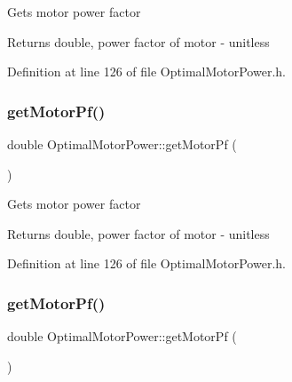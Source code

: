 Gets motor power factor

\begin{DoxyReturn}{Returns}
double, power factor of motor -\/ unitless 
\end{DoxyReturn}


Definition at line 126 of file Optimal\+Motor\+Power.\+h.

\mbox{\label{class_optimal_motor_power_a94d4c8a84c1bd19b799e35b966368f5a}} 
\subsubsection{\texorpdfstring{get\+Motor\+Pf()}{getMotorPf()}\hspace{0.1cm}{\footnotesize\ttfamily [2/3]}}
{\footnotesize\ttfamily double Optimal\+Motor\+Power\+::get\+Motor\+Pf (\begin{DoxyParamCaption}{ }\end{DoxyParamCaption})\hspace{0.3cm}{\ttfamily [inline]}}

Gets motor power factor

\begin{DoxyReturn}{Returns}
double, power factor of motor -\/ unitless 
\end{DoxyReturn}


Definition at line 126 of file Optimal\+Motor\+Power.\+h.

\mbox{\label{class_optimal_motor_power_a94d4c8a84c1bd19b799e35b966368f5a}} 
\subsubsection{\texorpdfstring{get\+Motor\+Pf()}{getMotorPf()}\hspace{0.1cm}{\footnotesize\ttfamily [3/3]}}
{\footnotesize\ttfamily double Optimal\+Motor\+Power\+::get\+Motor\+Pf (\begin{DoxyParamCaption}{ }\end{DoxyParamCaption})\hspace{0.3cm}{\ttfamily [inline]}}

